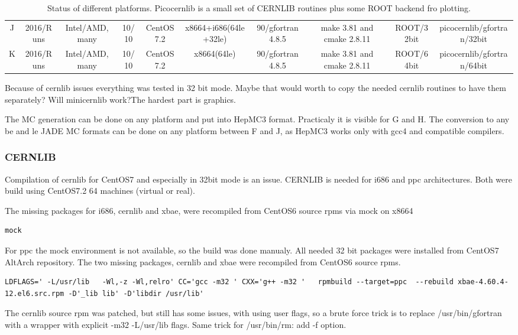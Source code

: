 \begin{sidewaystable}[htbp]
\begin{tabular}{|c|c|c|c|c|c|c|c|c|c|}
J   & 2016/Runs         &  Intel/AMD, many            &10/10   &CentOS7.2 & x8664+i686(64le+32le)   & 90/gfortran 4.8.5         &make 3.81 and cmake 2.8.11      &ROOT/32bit& picocernlib/gfortran/32bit     \\
K   & 2016/Runs         &  Intel/AMD, many            &10/10   &CentOS7.2 & x8664(64le)             & 90/gfortran 4.8.5         &make 3.81 and cmake 2.8.11      &ROOT/64bit& picocernlib/gfortran/64bit\\
\hline
\end{tabular}
\caption{Status of different platforms.  Picocernlib is a small set of CERNLIB routines plus some ROOT backend fro plotting. }
\label{tab:status}
\end{sidewaystable}


Because of cernlib issues everything was tested in 32 bit mode.
Maybe that would worth to copy the needed cernlib routines to have them separately?
Will minicernlib work?The hardest part is graphics.

The MC generation can be done on any platform and put into HepMC3 format.
Practicaly it is visible for G and H.
The conversion to any be and le JADE MC formats can be done on any platform between F and J,
as HepMC3 works only with gcc4 and compatible compilers. 



\subsubsection{CERNLIB}
Compilation of cernlib for CentOS7 and especially in 32bit mode is an issue.
CERNLIB is needed for i686 and ppc architectures.
Both were build using CentOS7.2 64 machines (virtual or real).



The missing packages for i686, cernlib and xbae, were recompiled from CentOS6 source rpms via mock on x8664
\begin{verbatim}
mock
\end{verbatim}



For ppc the mock environment is not available, so the build was done manualy.
All needed 32 bit packages were installed from CentOS7 AltArch repository.
The two missing packages, cernlib and xbae were recompiled from CentOS6 source rpms.
\begin{Verbatim}[fontsize=\tiny]
LDFLAGS=' -L/usr/lib   -Wl,-z -Wl,relro' CC='gcc -m32 ' CXX='g++ -m32 '   rpmbuild --target=ppc  --rebuild xbae-4.60.4-12.el6.src.rpm -D'_lib lib' -D'libdir /usr/lib'
\end{Verbatim}
The cernlib source rpm was patched, but still has some issues, with using user flags, so
a brute force trick is to replace /usr/bin/gfortran with a wrapper with explicit -m32 -L/usr/lib flags.
Same trick for /usr/bin/rm:   add -f option.

